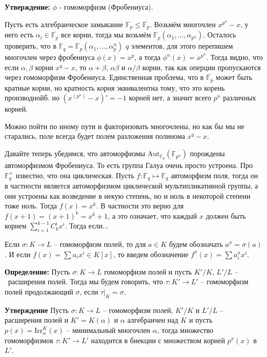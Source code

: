 \documentclass[a4paper, 12pt]{book}
\begin{document}
\textbf{Утверждение:} $\phi$ - гомоморфизм (Фробениуса).

Пусть есть алгебраическое замыкание $\mathbb{F}_p\le\overline{\mathbb{F}_p}$.
Возьмём многочлен $x^{p^n}-x$, у него есть $\alpha_i\in\overline{\mathbb{F}_p}$
все корни, тогда мы возьмём $\mathbb{F}_p(\alpha_1,\ldots,\alpha_{p^n})$.
Осталось проверить, что в $\mathbb{F}_q=\mathbb{F}_p(\alpha_1,\ldots,\alpha_p^n)$
$q$ элементов, для этого перепишем многочлен через фробениуса $\phi(x)=x^p$, а
тогда $\phi^n(x)=x^{p^n}$. Тогда видно, что если $\alpha,\beta$ корни $x^q-x$,
то $\alpha+\beta$, $\alpha\beta$ и $\alpha/\beta$ корни, так как оперции
пропускаются через гомоморфизм Фробениуса. Единственная проблема, что в
$\overline{\mathbb{F}_p}$ может быть кратные корни, но кратность корня
эквивалентна тому, что это корень производнойб. но $(x^(p^n)-x)'=-1$ корней нет,
а значит всего $p^n$ различных корней.

Можно пойти по иному пути и факторизовать многочлены, но как бы мы не старались,
поле всегда будет полем разложения полинома $x^q-x$.

Давайте теперь убедимся, что автоморфизмы $\text{Aut}_{\mathbb{F}_p}(
\mathbb{F}_{p^n})$ порождены автоморфизмом Фробениуса. То есть группа Галуа
очень просто устроена. Про $\mathbb{F}_q^\times$ известно, что она циклическая.
Пусть $f:\mathbb{F}_q\mapsto\mathbb{F}_q$ автоморфизм поля, тогда он в
частности является автоморфизмом циклической мультипликативной группы, а они
устроены как возведение в некую степень, но и ноль в некоторой степени тоже ноль.
Тогда $f(x)=x^k$. В частности это верно для $f(x+1)=(x+1)^k=x^k+1$, а это
означает, что каждый $x$ должен быть корнем $\sum_{i=1}^{k-1}C_k^ix^i$. Тогда
если...

Если $\sigma:K\rightarrow L$ – гомоморфизм полей, то для $a\in K$ будем
обозначать $a^\sigma=\sigma(a)$. И если $f(x)=\sum a_ix^i\in K[x]$, то введем
обозначение $f^\sigma(x)=\sum a_i^\sigma x^i$.

\textbf{Определение:} Пусть $\sigma:K\rightarrow L$ гомоморфизм полей и пусть
$K'/K,\,L'/L$ – расширения полей. Тогда мы будем говорить, что $\tau:K'
\rightarrow L'$ – гомоморфизм полей продолжающий $\sigma$, если $\tau|_K=\sigma$.

\textbf{Утверждение} Пусть $\sigma:K\rightarrow L$ – гомоморфизм полей, $K'/K$ 
и $L'/L$ – расширения полей и $K'=K(\alpha)$ и $\alpha$ алгебраичен над $K$ и
пусть $p(x)=\text{Irr}_\alpha^K(x)$ – минимальный многочлен $\alpha$, тогда
множество гомоморфизмов $\tau:K'\rightarrow L'$ находится в биекции с
множеством корней $p^\sigma(x)$ в $L'$.
\end{document}
